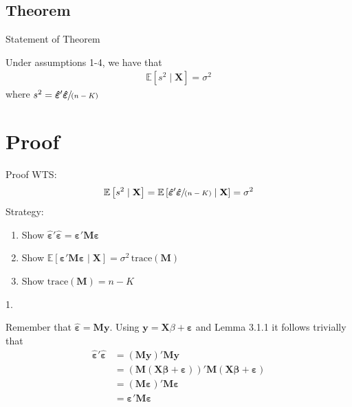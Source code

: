 \documentclass{beamer}
\begin{document}
\subsection{Theorem}
\begin{frame}{Statement of Theorem}
\fontsize{15pt}{10}\selectfont
    \begin{theorem}
    \vspace{5pt}
    Under assumptions 1-4, we have that
    \begin{align*}
        \mathbb{E} \left[ s^2 \mid \mathbf{X} \right] = \sigma^2 
    \end{align*}
    where $s^2 = \bm{\hat{\varepsilon}}' \bm{\hat{\varepsilon}} \sfrac{}{(n-K)}$
    \end{theorem}
\end{frame}


\section{Proof}

\begin{frame}{Proof}
\fontsize{15pt}{10}\selectfont
WTS: 
\begin{align*}
\mathbb{E} \left [ s^2 \mid \mathbf{X} \right] = \mathbb{E} \left [ \bm{\hat{\varepsilon}}' \bm{\hat{\varepsilon}} \sfrac{}{(n-K)} \mid \mathbf{X} \right] = \sigma^2
\end{align*}
\vspace{5pt}
Strategy:
\begin{enumerate}
    \item Show $\bm{\hat{\varepsilon}}' \bm{\hat{\varepsilon}} = \bm{\varepsilon}'\mathbf{M} \bm{\varepsilon}$
    \item Show $\mathbb{E} \left[ \bm{\varepsilon}'\mathbf{M} \bm{\varepsilon} \mid \mathbf{X} \right] = \sigma^2 \, \text{trace}(\mathbf{M})$
    \item Show $\text{trace}(\mathbf{M})=n-K$
\end{enumerate}
\end{frame}

\begin{frame}{1.}
\fontsize{15pt}{10}\selectfont

Remember that $\bm{\hat{\varepsilon}} = \mathbf{M} \bm{y}$. Using $\bm{y} = \mathbf{X} \beta + \bm{\varepsilon}$ and Lemma 3.1.1 it follows trivially that  
\begin{align*}
\hat{\boldsymbol{\varepsilon}}'\hat{\boldsymbol{\varepsilon}}
& = (\mathbf{M}\mathbf{y})'\mathbf{M}\mathbf{y}\\
& = (\mathbf{M}(\mathbf{X}\boldsymbol{\beta}+\boldsymbol{\varepsilon}))'\mathbf{M}(\mathbf{X}\boldsymbol{\beta}+\boldsymbol{\varepsilon})\\
& = (\mathbf{M}\boldsymbol{\varepsilon})'\mathbf{M}\boldsymbol{\varepsilon}\\
& = \boldsymbol{\varepsilon}'\mathbf{M}\boldsymbol{\varepsilon}
\end{align*}
\end{frame}
\end{document}
